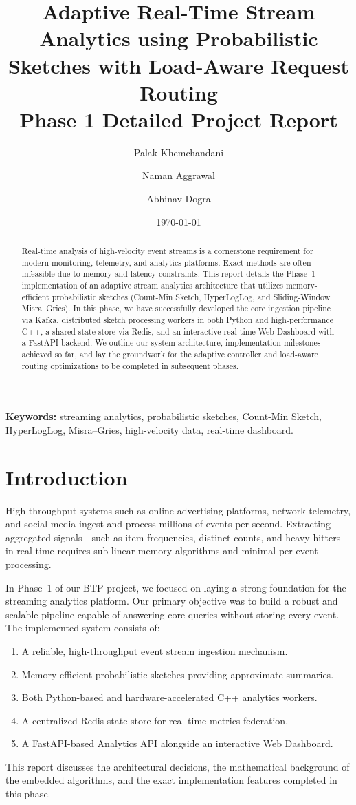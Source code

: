 \documentclass[12pt,a4paper]{article}
\title{\textbf{Adaptive Real-Time Stream Analytics using Probabilistic Sketches with Load-Aware Request Routing}\\
\large Phase 1 Detailed Project Report}
\author[1]{Palak Khemchandani}
\author[1]{Naman Aggrawal}
\author[1]{Abhinav Dogra}
\affil[1]{Department of Computer Science, The LNM Institute of Information Technology\\
\vspace{0.5em}
\textbf{Faculty Mentor:} Dr. Subrat K Dash}
\date{\today}
\begin{document}
\maketitle
\thispagestyle{empty}

\begin{abstract}
\noindent Real-time analysis of high-velocity event streams is a cornerstone requirement for modern monitoring, telemetry, and analytics platforms. Exact methods are often infeasible due to memory and latency constraints. This report details the Phase~1 implementation of an adaptive stream analytics architecture that utilizes memory-efficient probabilistic sketches (Count-Min Sketch, HyperLogLog, and Sliding-Window Misra--Gries). In this phase, we have successfully developed the core ingestion pipeline via Kafka, distributed sketch processing workers in both Python and high-performance C++, a shared state store via Redis, and an interactive real-time Web Dashboard with a FastAPI backend. We outline our system architecture, implementation milestones achieved so far, and lay the groundwork for the adaptive controller and load-aware routing optimizations to be completed in subsequent phases.
\end{abstract}

\vspace{1em}
\noindent\textbf{Keywords:} streaming analytics, probabilistic sketches, Count-Min Sketch, HyperLogLog, Misra--Gries, high-velocity data, real-time dashboard.

\newpage
\tableofcontents
\newpage

\section{Introduction}
\label{sec:intro}
High-throughput systems such as online advertising platforms, network telemetry, and social media ingest and process millions of events per second. Extracting aggregated signals—such as item frequencies, distinct counts, and heavy hitters—in real time requires sub-linear memory algorithms and minimal per-event processing.

In Phase~1 of our BTP project, we focused on laying a strong foundation for the streaming analytics platform. Our primary objective was to build a robust and scalable pipeline capable of answering core queries without storing every event. The implemented system consists of:
\begin{enumerate}
    \item A reliable, high-throughput event stream ingestion mechanism.
    \item Memory-efficient probabilistic sketches providing approximate summaries.
    \item Both Python-based and hardware-accelerated C++ analytics workers.
    \item A centralized Redis state store for real-time metrics federation.
    \item A FastAPI-based Analytics API alongside an interactive Web Dashboard.
\end{enumerate}
This report discusses the architectural decisions, the mathematical background of the embedded algorithms, and the exact implementation features completed in this phase.
\end{document}
